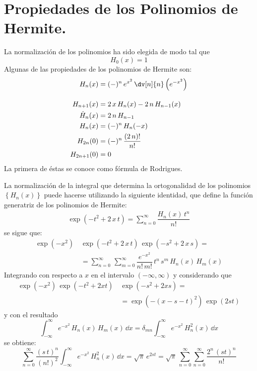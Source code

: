 \section{Propiedades de los Polinomios de Hermite.}
La normalización de los polinomios ha sido elegida de modo tal que 
\[ H_{0}(x) = 1\]
Algunas de las propiedades de los polinomios de Hermite son:
\begin{align*}
H_{n} (x) &= (-)^{n} \, e^{x^{2}} \, \dv[n]{n} \left( e^{-x^{2}} \right) \\[1em]
H_{n+1} (x) &= 2 \, x \, H_{n} (x) - 2 \, n \, H_{n-1} (x) \\
\dot{H}_{n} (x) &= 2 \, n \, H_{n-1} \\
H_{n} (x) &= (-)^{n} \, H_{n} (-x) \\
H_{2n} (0) &= (-)^{n} \, \dfrac{(2 \, n)!}{n!} \\
H_{2n+1} (0) &= 0
\end{align*}
La primera de éstas se conoce como fórmula de Rodrigues.
\par
La normalización de la integral que determina la ortogonalidad de los polinomios $\left\{ H_{n} (x) \right\}$ puede hacerse utilizando la siguiente identidad, que define la función generatriz de los polinomios de Hermite:
\begin{align*}
\exp \left( -t^{2} + 2 \, x \, t \right) = \sum_{n=0}^{\infty} \dfrac{H_{n} (x) \, t^{n}}{n!}
\end{align*}
se sigue que:
\begin{align*}
\exp \left( -x^{2} \right) \, & \exp \left( -t^{2} + 2 \, x \, t \right) \, \exp \left( -s^{2} + 2 \, x \, s \right) = \\
&= \sum_{n=0}^{\infty} \, \sum_{m=0}^{\infty} \dfrac{e^{-x^{2}}}{n! \, m!} \, t^{n} \, s^{m} \, H_{n} (x) \, H_{m} (x)
\end{align*}
Integrando con respecto a $x$ en el intervalo $(-\infty, \infty)$ y considerando que
\begin{align*}
\exp \left( -x^{2} \right) \, \exp \left( -t^{2} + 2 x t \right) \, &\exp \left( -s^{2} + 2 x s \right) = \\
&= \exp \left( - (x - s - t)^{2} \right) \, \exp \left( 2 s t \right)
\end{align*}
y con el resultado
\[ \int_{-\infty}^{\infty} e^{-x^{2}} \, H_{n} (x) \, H_{m} (x) \, \dd{x} = \delta_{m n} \int_{-\infty}^{\infty} e^{-x^{2}} \, H_{n}^{2} (x) \, \dd{x} \]
se obtiene:
\[ \sum_{n=0}^{\infty} \dfrac{(s \, t)^{n}}{(n!)^{2}} \int_{-\infty}^{\infty} e^{-x^{2}} \, H_{n}^{2} (x) \, \dd{x} = \sqrt{\pi} \, e^{2 s t } = \sqrt{\pi} \, \sum_{n=0}^{\infty} \sum_{n=0}^{\infty} \dfrac{2^{n} \, (s t)^{n}}{n!} \]
